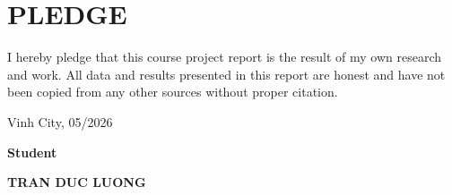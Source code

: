 \section*{PLEDGE}
\thispagestyle{empty}
I hereby pledge that this course project report is the result of my own research and work. All data and results presented in this report are honest and have not been copied from any other sources without proper citation.

\vspace{6pt}
\hspace{7cm}Vinh City, 05/2026

\hspace{9cm}\textbf{Student}

\vspace{2cm}
\hspace{8.3cm}\textbf{TRAN DUC LUONG}
\cleardoublepage